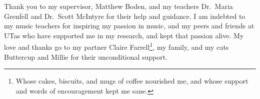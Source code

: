 \cleardoublepage{}
\renewcommand*{\thefootnote}{\fnsymbol{footnote}}
\begin{center}
	
	Thank you to my supervisor, Matthew Boden, and my teachers Dr.\ Maria Grenfell and Dr.\ Scott McIntyre for their help and guidance. 
	I am indebted to my music teachers for inspiring my passion in music, and my peers and friends at UTas who have supported me in my research, and kept that passion alive. 
	My love and thanks go to my partner Claire Farrell\footnote{Whose cakes, biscuits, and mugs of coffee nourished me, and whose support and words of encouragement kept me sane.}, my family, and my cats Buttercup and Millie for their unconditional support.
	
\end{center}
\cleardoublepage{}
